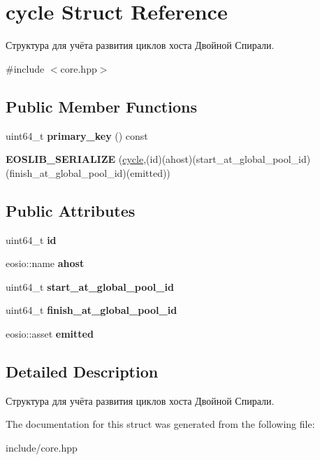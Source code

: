 \hypertarget{structcycle}{}\section{cycle Struct Reference}
\label{structcycle}


Структура для учёта развития циклов хоста Двойной Спирали.  




{\ttfamily \#include $<$core.\+hpp$>$}

\subsection*{Public Member Functions}
\begin{DoxyCompactItemize}
\item 
\mbox{\label{structcycle_af8cc307aa90e11b78548dd6921ac9337}} 
uint64\+\_\+t {\bfseries primary\+\_\+key} () const
\item 
\mbox{\label{structcycle_a584fb1cb198a96fb12b9bc0cd5447f6c}} 
{\bfseries E\+O\+S\+L\+I\+B\+\_\+\+S\+E\+R\+I\+A\+L\+I\+ZE} (\mbox{\hyperlink{structcycle}{cycle}},(id)(ahost)(start\+\_\+at\+\_\+global\+\_\+pool\+\_\+id)(finish\+\_\+at\+\_\+global\+\_\+pool\+\_\+id)(emitted))
\end{DoxyCompactItemize}
\subsection*{Public Attributes}
\begin{DoxyCompactItemize}
\item 
\mbox{\label{structcycle_a2dae7ac3b8113c0b0366126e042e0205}} 
uint64\+\_\+t {\bfseries id}
\item 
\mbox{\label{structcycle_abf11d98232387603ab12ae556257c814}} 
eosio\+::name {\bfseries ahost}
\item 
\mbox{\label{structcycle_acabb7980124283136d9df215a53e8397}} 
uint64\+\_\+t {\bfseries start\+\_\+at\+\_\+global\+\_\+pool\+\_\+id}
\item 
\mbox{\label{structcycle_aa414b190d5404ada4c3c98e624d5d934}} 
uint64\+\_\+t {\bfseries finish\+\_\+at\+\_\+global\+\_\+pool\+\_\+id}
\item 
\mbox{\label{structcycle_afb69f93b40d1614cfe006ca17212f801}} 
eosio\+::asset {\bfseries emitted}
\end{DoxyCompactItemize}


\subsection{Detailed Description}
Структура для учёта развития циклов хоста Двойной Спирали. 

The documentation for this struct was generated from the following file\+:\begin{DoxyCompactItemize}
\item 
include/core.\+hpp\end{DoxyCompactItemize}
